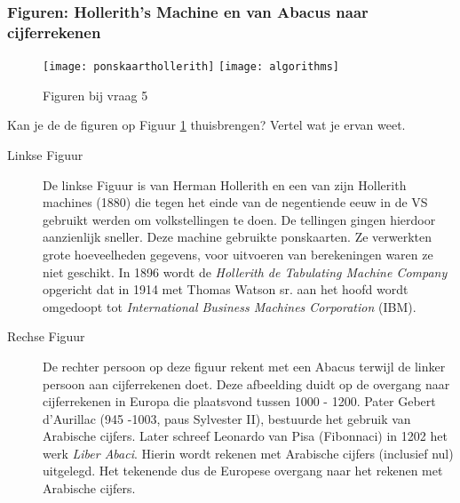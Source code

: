 \documentclass[../main.tex]{subfiles}
\begin{document}
\subsubsection{Figuren: Hollerith's Machine en van Abacus naar cijferrekenen}

\begin{figure}[ht!]
	\begin{center}
		\texttt{[image: ponskaarthollerith]}
		\texttt{[image: algorithms]}
	\end{center}
	\caption{Figuren bij vraag 5}
	\label{fig:vraag5}
\end{figure}

\begin{question}
Kan je de de figuren op Figuur \ref{fig:vraag5} thuisbrengen? Vertel wat je ervan weet.
\end{question}
\begin{description}
	\item[Linkse Figuur] De linkse Figuur is van Herman Hollerith en een van zijn Hollerith machines (1880) die tegen het einde van de negentiende eeuw in de VS gebruikt werden om volkstellingen te doen. De tellingen gingen hierdoor aanzienlijk sneller.
	Deze machine gebruikte ponskaarten. Ze verwerkten grote hoeveelheden gegevens, voor uitvoeren van berekeningen waren ze niet geschikt.
	In 1896 wordt de \emph{Hollerith de Tabulating Machine Company} opgericht dat in 1914 met Thomas Watson sr. aan het hoofd wordt omgedoopt tot \emph{International Business Machines Corporation} (IBM).
	\item[Rechse Figuur] De rechter persoon op deze figuur rekent met een Abacus terwijl de linker persoon aan cijferrekenen doet. Deze afbeelding duidt op de overgang naar cijferrekenen in Europa die plaatsvond tussen 1000 - 1200. Pater Gebert d'Aurillac (945 -1003, paus Sylvester II), bestuurde het gebruik van Arabische cijfers. Later schreef Leonardo van Pisa (Fibonnaci) in 1202 het werk \emph{Liber Abaci}. Hierin wordt rekenen met Arabische cijfers (inclusief nul) uitgelegd. Het tekenende dus de Europese overgang naar het rekenen met Arabische cijfers.
\end{description}
\end{document}
